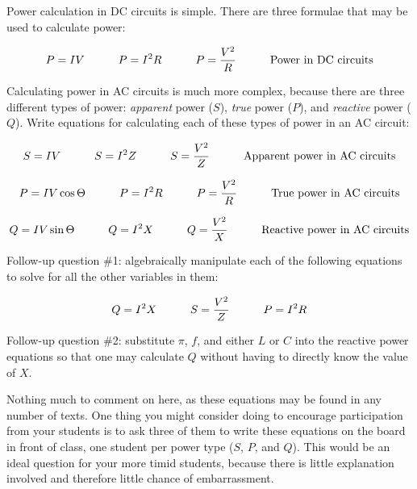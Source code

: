 

Power calculation in DC circuits is simple.  There are three formulae that may be used to calculate power:

$$P = IV \hbox{\hskip 30pt} P = I^2 R \hbox{\hskip 30pt} P = {V^2 \over R} \hbox{\hskip 30pt Power in DC circuits}$$

Calculating power in AC circuits is much more complex, because there are three different types of power: {\it apparent} power ($S$), {\it true} power ($P$), and {\it reactive} power ($Q$).  Write equations for calculating each of these types of power in an AC circuit:

\vskip 40pt







$$S = IV \hbox{\hskip 30pt} S = I^2 Z \hbox{\hskip 30pt} S = {V^2 \over Z} \hbox{\hskip 30pt Apparent power in AC circuits}$$

$$P = IV \cos \Theta \hbox{\hskip 30pt} P = I^2 R \hbox{\hskip 30pt} P = {V^2 \over R} \hbox{\hskip 30pt True power in AC circuits}$$

$$Q = IV \sin \Theta \hbox{\hskip 30pt} Q = I^2 X \hbox{\hskip 30pt} Q = {V^2 \over X} \hbox{\hskip 30pt Reactive power in AC circuits}$$

\vskip 10pt

Follow-up question \#1: algebraically manipulate each of the following equations to solve for all the other variables in them:

$$Q = I^2 X \hbox{\hskip 30pt} S = {V^2 \over Z} \hbox{\hskip 30pt} P = I^2 R$$

\vskip 10pt

Follow-up question \#2: substitute $\pi$, $f$, and either $L$ or $C$ into the reactive power equations so that one may calculate $Q$ without having to directly know the value of $X$.







Nothing much to comment on here, as these equations may be found in any number of texts.  One thing you might consider doing to encourage participation from your students is to ask three of them to write these equations on the board in front of class, one student per power type ($S$, $P$, and $Q$).  This would be an ideal question for your more timid students, because there is little explanation involved and therefore little chance of embarrassment.




